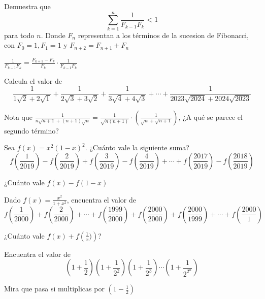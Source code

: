 \documentclass[11pt]{scrartcl}
\begin{document}
    \begin{problem}
        Demuestra que 
        \[\sum_{k=1}^n\frac{1}{F_{k-1}F_{k}}<1\]
        para todo $n$. Donde $F_n$ representan a los términos de la sucesion de Fibonacci, con $F_0=1, F_1=1$ y $F_{n+2}=F_{n+1}+F_{n}$
        \begin{hint}
            $\frac{1}{F_{k-1}F_k}=\frac{F_{k+1}-F_k}{F_k}\cdot \frac{1}{F_{k-1}F_k}$
        \end{hint}
    \end{problem} \hspace{0.2cm}
    \begin{problem}
        Calcula el valor de 
        \[\frac{1}{1\sqrt{2}+2\sqrt{1}}+\frac{1}{2\sqrt{3}+3\sqrt{2}}+\frac{1}{3\sqrt{4}+4\sqrt{3}}+\cdots+\frac{1}{2023\sqrt{2024}+2024\sqrt{2023}}\]
        \begin{hint}
            Nota que $\frac{1}{n\sqrt{n+1}+(n+1)\sqrt{n}}=\frac{1}{\sqrt{n(n+1)}}\cdot\left(\frac{1}{\sqrt{n}+\sqrt{n+1}}\right)$, ¿A qué se parece el segundo término?
        \end{hint}
        \end{problem}
        \begin{problem}
            Sea $f(x) = x^{2}(1-x)^{2}$. ¿Cuánto vale la siguiente suma?
\[f\left(\frac{1}{2019}\right)-f\left(\frac{2}{2019}\right)+f\left(\frac{3}{2019}\right)-f\left(\frac{4}{2019}\right)+\cdots
+f\left(\frac{2017}{2019}\right) - f\left(\frac{2018}{2019}\right)\]
\begin{hint}
    ¿Cuánto vale $f(x)-f(1-x)$
\end{hint}
\end{problem} \hspace{0.2cm}
\begin{problem}
     Dado $f(x)=\frac{x^2}{1+x^2}$, encuentra el valor de 
\[f\left( \frac{1}{2000} \right)+f\left( \frac{2}{2000} \right)+\cdots+ f\left( \frac{1999}{2000} \right)+f\left( \frac{2000}{2000} \right)+f\left( \frac{2000}{1999} \right)+\cdots+f\left( \frac{2000}{1} \right)\]
\begin{hint}
    ¿Cuánto vale $f(x)+f\left(\frac{1}{x})\right)$?
\end{hint}
        \end{problem} \hspace{0.2cm}
   \begin{problem}
       Encuentra el valor de \[\left(1+\frac{1}{2}\right)\left(1+\frac{1}{2^2}\right)\left(1+\frac{1}{2^3}\right)\cdots \left(1+\frac{1}{2^{2^n}}\right)\]
       \begin{hint}
           Mira que pasa si multiplicas por $\left(1-\frac{1}{2}\right)$
       \end{hint}
   \end{problem}
\end{document}
